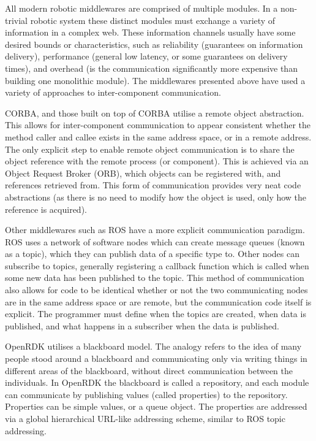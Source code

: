 \documentclass[../dissertation.tex]{subfiles}
\begin{document}
All modern robotic middlewares are comprised of multiple modules. In a non-trivial robotic system these distinct modules must exchange a variety of information in a complex web. These information channels usually have some desired bounds or characteristics, such as reliability (guarantees on information delivery), performance (general low latency, or some guarantees on delivery times), and overhead (is the communication significantly more expensive than building one monolithic module). The middlewares presented above have used a variety of approaches to inter-component communication.

CORBA, and those built on top of CORBA utilise a remote object abstraction. This allows for inter-component communication to appear consistent whether the method caller and callee exists in the same address space, or in a remote address. The only explicit step to enable remote object communication is to share the object reference with the remote process (or component). This is achieved via an Object Request Broker (ORB), which objects can be registered with, and references retrieved from. This form of communication provides very neat code abstractions (as there is no need to modify how the object is used, only how the reference is acquired).

Other middlewares such as ROS have a more explicit communication paradigm. ROS uses a network of software nodes which can create message queues (known as a topic), which they can publish data of a specific type to. Other nodes can subscribe to topics, generally registering a callback function which is called when some new data has been published to the topic. This method of communication also allows for code to be identical whether or not the two communicating nodes are in the same address space or are remote, but the communication code itself is explicit. The programmer must define when the topics are created, when data is published, and what happens in a subscriber when the data is published.

OpenRDK utilises a blackboard model. The analogy refers to the idea of many people stood around a blackboard and communicating only via writing things in different areas of the blackboard, without direct communication between the individuals. In OpenRDK the blackboard is called a repository, and each module can communicate by publishing values (called properties) to the repository. Properties can be simple values, or a queue object. The properties are addressed via a global hierarchical URL-like addressing scheme, similar to ROS topic addressing.
\end{document}
